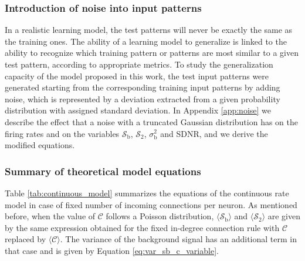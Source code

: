 \documentclass[a4paper, 12pt, twoside, openright]{book}
\newcommand{\C}{\mathcal{C}}
\newcommand{\SII}{\mathcal{S}_\text{2}}
\newcommand{\Sb}{\mathcal{S}_\text{b}}
\newcommand{\varSb}{\sigma^{2}_\text{b}}
\begin{document}
\subsubsection{\label{subseq:noise} Introduction of noise into input patterns}
In a realistic learning model, the test patterns will never be exactly the same as the training ones. The ability of a learning model to generalize is linked to the ability to recognize which training pattern or patterns are most similar to a given test pattern, according to appropriate metrics.
To study the generalization capacity of the model proposed in this work, the test input patterns were generated starting from the corresponding training input patterns by adding
noise, which is represented by a deviation extracted from a given probability distribution with assigned standard deviation.
In Appendix \ref{app:noise} we describe the effect that a noise with a truncated Gaussian distribution has on the firing rates and on the variables $\Sb$, $\SII$, $\varSb$ and SDNR, and we derive the modified equations.

\subsubsection{\label{subseq:summary} Summary of theoretical model equations}
Table \ref{tab:continuous_model} summarizes the equations of the continuous rate model in case of fixed number of incoming connections per neuron. As mentioned before, when the value of $\C$ follows a Poisson distribution, $\langle\Sb\rangle$ and $\langle\SII\rangle$ are given by the same expression obtained for the fixed in-degree connection rule with $\C$ replaced by $\langle\C\rangle$. The variance of the background signal has an additional term in that case and is given by Equation \eqref{eq:var_sb_c_variable}.
\end{document}
